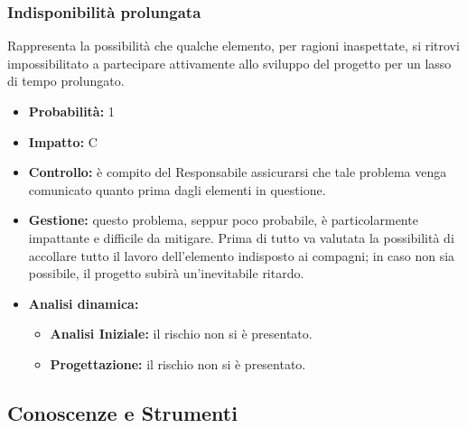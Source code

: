 \documentclass[a4paper,11pt]{article}
\begin{document}
		\subsubsection{Indisponibilità prolungata}
		Rappresenta la possibilità che qualche elemento, per ragioni inaspettate, si ritrovi impossibilitato a partecipare attivamente allo sviluppo del progetto per un lasso di tempo prolungato. 
		\begin{itemize}
		\item \textbf{Probabilità: }1
		\item \textbf{Impatto: }C
		\item \textbf{Controllo:} è compito del Responsabile assicurarsi che tale problema venga comunicato quanto prima dagli elementi in questione.
		\item \textbf{Gestione:} questo problema, seppur poco probabile, è particolarmente impattante e difficile da mitigare. Prima di tutto va valutata la possibilità di accollare tutto il lavoro dell'elemento indisposto ai compagni; in caso non sia possibile, il progetto subirà un'inevitabile ritardo.
		\item \textbf{Analisi dinamica:}
			\begin{itemize}
				\item\textbf{Analisi Iniziale:} il rischio non si è presentato.
				\item\textbf{Progettazione:} il rischio non si è presentato.
			\end{itemize}
		\end{itemize}
	\subsection{Conoscenze e Strumenti}
\end{document}
